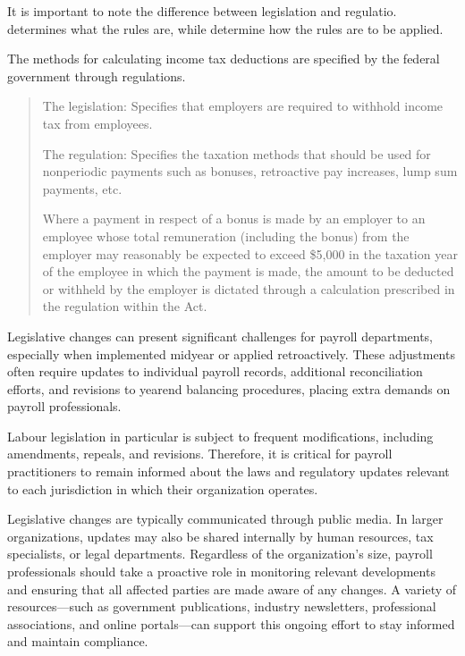 \documentclass[letterpaper,10pt,english]{sphinxmanual}
\begin{document}
\sphinxAtStartPar
It is important to note the difference between legislation and regulatio.  determines what the rules are, while  determine how the rules are to be
applied.

\sphinxAtStartPar
The methods for calculating income tax deductions are specified by the federal government through regulations.
\begin{quote}

\sphinxAtStartPar
{}

\sphinxAtStartPar
{}

\sphinxAtStartPar
The legislation: Specifies that employers are required to withhold income tax from employees.

\sphinxAtStartPar
The regulation: Specifies the taxation methods that should be used for non\sphinxhyphen{}periodic payments such as bonuses, retroactive pay increases, lump sum payments, etc.

\sphinxAtStartPar
{}

\sphinxAtStartPar
Where a payment in respect of a bonus is made by an employer to an employee whose total remuneration (including the bonus) from the employer
may reasonably be expected to exceed \$5,000 in the taxation year of the employee in which the payment is made, the amount to be deducted or withheld by the employer is dictated
through a calculation prescribed in the regulation within the Act.
\end{quote}

\sphinxAtStartPar
Legislative changes can present significant challenges for payroll departments, especially when implemented mid\sphinxhyphen{}year or
applied retroactively. These adjustments often require updates to individual payroll records, additional reconciliation
efforts, and revisions to year\sphinxhyphen{}end balancing procedures, placing extra demands on payroll professionals.

\sphinxAtStartPar
Labour legislation in particular is subject to frequent modifications, including amendments, repeals, and revisions.
Therefore, it is critical for payroll practitioners to remain informed about the laws and regulatory updates relevant to
each jurisdiction in which their organization operates.

\sphinxAtStartPar
Legislative changes are typically communicated through public media. In larger organizations, updates may also be shared
internally by human resources, tax specialists, or legal departments. Regardless of the organization’s size, payroll
professionals should take a proactive role in monitoring relevant developments and ensuring that all affected parties are
made aware of any changes. A variety of resources—such as government publications, industry newsletters, professional
associations, and online portals—can support this ongoing effort to stay informed and maintain compliance.
\end{document}
